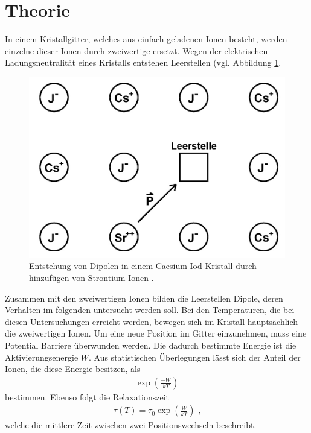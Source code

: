 \section{Theorie}
\label{sec:Theorie}
In einem Kristallgitter, welches aus einfach geladenen Ionen besteht, werden einzelne dieser Ionen durch zweiwertige ersetzt.
Wegen der elektrischen Ladungsneutralität eines Kristalls entstehen Leerstellen (vgl. Abbildung \ref{fig:t:2}.
\begin{figure}
\centering
\includegraphics[scale=0.5]{content/kristall.jpg}
\caption{Entstehung von Dipolen in einem Caesium-Iod Kristall durch hinzufügen von Strontium Ionen \cite{Anleitung}.}
\label{fig:t:2}
\end{figure}
Zusammen mit den zweiwertigen Ionen bilden die Leerstellen Dipole, deren Verhalten im folgenden untersucht werden soll.
Bei den Temperaturen, die bei diesen Untersuchungen erreicht werden, bewegen sich im Kristall hauptsächlich die zweiwertigen Ionen.
Um eine neue Position im Gitter einzunehmen, muss eine Potential Barriere überwunden werden.
Die dadurch bestimmte Energie ist die Aktivierungsenergie $W$.
Aus statistischen Überlegungen lässt sich der Anteil der Ionen, die diese Energie besitzen, als 
\begin{align}
\exp \left(\frac{-W}{kT}\right)
\label{eq:t:1}
\end{align}
bestimmen.
Ebenso folgt die Relaxationszeit
\begin{align}
\tau(T)=\tau_0 \exp\left(\frac{W}{kT}\right)\text{ ,}
\label{eq:t:2}
\end{align}
welche die mittlere Zeit zwischen zwei Positionswechseln beschreibt.

